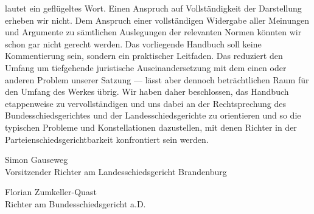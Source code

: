  lautet ein geflügeltes Wort.
Einen Anspruch auf Vollständigkeit der Darstellung erheben wir nicht. Dem Anspruch einer vollständigen Widergabe aller Meinungen und Argumente zu sämtlichen Auslegungen der relevanten Normen könnten wir schon gar nicht gerecht werden.
Das vorliegende Handbuch soll keine Kommentierung sein, sondern ein praktischer Leitfaden. Das reduziert den Umfang um tiefgehende juristische Auseinandersetzung mit dem einen oder anderen Problem unserer Satzung --- lässt aber dennoch beträchtlichen Raum für den Umfang des Werkes übrig.
Wir haben daher beschlossen, das Handbuch etappenweise zu vervollständigen und uns dabei an der Rechtsprechung des Bundesschiedsgerichtes und der Landesschiedsgerichte zu orientieren und so die typischen Probleme und Konstellationen dazustellen, mit denen Richter in der Parteienschiedsgerichtbarkeit konfrontiert sein werden.


\vspace{20mm}

Simon Gauseweg\\
Vorsitzender Richter am Landesschiedsgericht Brandenburg

\vspace{5mm}

Florian Zumkeller-Quast\\
Richter am Bundesschiedsgericht a.D.


 
